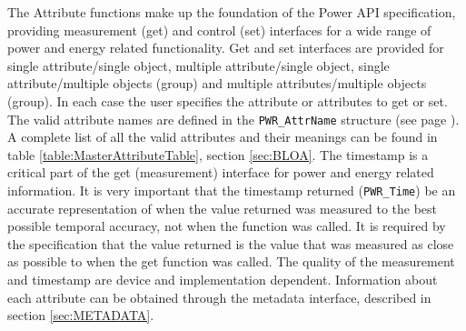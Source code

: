 The Attribute functions make up the foundation of the Power API specification, providing measurement (get) and control (set) interfaces for a wide range of power and energy related functionality.
Get and set interfaces are provided for single attribute/single object, multiple attribute/single object, single attribute/multiple objects (group) and multiple attributes/multiple objects (group).
In each case the user specifies the attribute or attributes to get or set.
The valid attribute names are defined in the \texttt{PWR_AttrName} structure (see page \pageref{type:AttrName}).
A complete list of all the valid attributes and their meanings can be found in table \ref{table:MasterAttributeTable}, section \ref{sec:BLOA}.
The timestamp is a critical part of the get (measurement) interface for power and energy related information.
It is very important that the timestamp returned (\texttt{PWR_Time}) be an accurate representation of when the value returned was measured to the best possible temporal accuracy, not when the function was called.
It is required by the specification that the value returned is the value that was measured as close as possible to when the get function was called.
The quality of the measurement and timestamp are device and implementation dependent.
Information about each attribute can be obtained through the metadata interface, described in section \ref{sec:METADATA}.

